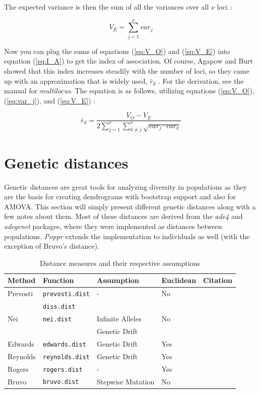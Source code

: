 \documentclass[letterpaper]{article}\usepackage[]{graphicx}\usepackage[]{color}
\newcommand{\Poppr}{\textit{Poppr}}
\newcommand{\adegenet}{\textit{adegenet}}
\begin{document}
The expected variance is then the sum of all the variances over all $\nu$ loci
\citep{Agapow:2001}:

\begin{equation}
\label{eq:V_E}
V_E = \displaystyle \sum_{j=1}^{\nu} var_j
\end{equation}

Now you can plug the sums of equations (\ref{eq:V_O}) and (\ref{eq:V_E}) into
equation (\ref{eq:I_A}) to get the index of association. Of course, Agapow and
Burt showed that this index increases steadily with the number of loci, so they
came up with an approximation that is widely used, $\bar r_d$
\citep{Agapow:2001}. For the derivation, see the manual for \textit{multilocus}.
The equation is as follows, utilizing equations (\ref{eq:V_O}),
(\ref{eq:var_j}), and (\ref{eq:V_E}) \citep{Agapow:2001}:

\begin{equation}
\label{eq:r_d}
\bar{r}_d = \frac{V_O - V_E}
{2\displaystyle \sum_{j=1}^{\nu}\displaystyle \sum_{k \neq j}^{\nu}\sqrt{var_j\cdot{}var_k}}
\end{equation}

\section{Genetic distances}

Genetic distances are great tools for analyzing diversity in
populations as they are the basis for creating dendrograms with bootstrap
support and also for AMOVA. This section will simply present different genetic
distances along with a few notes about them. Most of these distances are derived
from the \textit{ade4} and \adegenet{} packages, where they were implemented as
distances between populations. \Poppr{} extends the implementation to individuals
as well (with the exception of Bruvo's distance).

\begin{table}[ht]
\centering
\caption{Distance measures and their respective assumptions}
\begin{tabular}{lllll}
  \hline
 Method & Function & Assumption & Euclidean & Citation\\ 
  \hline
Prevosti & \texttt{prevosti.dist} & - & No & \citep{prevosti1975distances}\\
 & \texttt{diss.dist} & & & \\
Nei & \texttt{nei.dist} & Infinite Alleles & No & \citep{nei1972genetic, nei1978estimation}\\
 & & Genetic Drift & & \\
Edwards & \texttt{edwards.dist} & Genetic Drift & Yes & \citep{edwards1971distances}\\
Reynolds & \texttt{reynolds.dist} & Genetic Drift & Yes & \citep{reynolds1983estimation}\\
Rogers & \texttt{rogers.dist} & - & Yes & \citep{rogers1972measures}\\
Bruvo & \texttt{bruvo.dist} & Stepwise Mutation & No & \citep{Bruvo:2004}\\
   \hline
\end{tabular}
\end{table}
\end{document}
